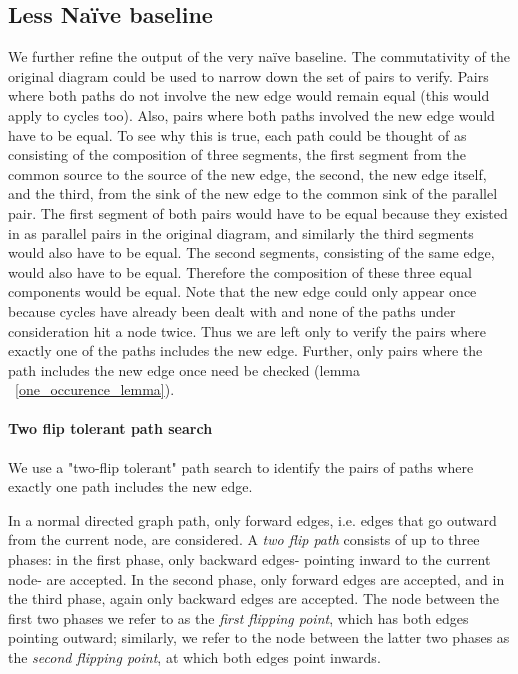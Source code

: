 \documentclass[sigplan,review,anonymous]{acmart}
\begin{document}
\subsection{Less Na\"{i}ve baseline}
We further refine the output of the very na\"{i}ve baseline.
The commutativity of the original diagram could be used to narrow down the set of pairs to verify.
Pairs where both paths do not involve the new edge would remain equal (this would apply to cycles too).
Also, pairs where both paths involved the new edge would have to be equal.
To see why this is true, each path could be thought of as consisting of the composition of three segments, the first segment from the common source to the source of the new edge, the second, the new edge itself, and the third, from the sink of the new edge to the common sink of the parallel pair.
The first segment of both pairs would have to be equal because they existed in as parallel pairs in the original diagram, and similarly the third segments would also have to be equal.
The second segments, consisting of the same edge, would also have to be equal. Therefore the composition of these three equal components would be equal. Note that the new edge could only appear once because cycles have already been dealt with and none of the paths under consideration hit a node twice.
Thus we are left only to verify the pairs where exactly one of the paths includes the new edge.
Further, only pairs where the path includes the new edge once need be checked (lemma ~\ref{one_occurence_lemma}).

\paragraph{Two flip tolerant path search}
We use a "two-flip tolerant" path search to identify the pairs of paths where exactly one path includes the new edge. 

In a normal directed graph path, only forward edges, i.e. edges that go outward from the current node, are considered. 
A \textit{two flip path} consists of up to three phases: in the first phase, only backward edges- pointing inward to the current node- are accepted. In the second phase, only forward edges are accepted, and in the third phase, again only backward edges are accepted. The node between the first two phases we refer to as the \textit{first flipping point}, which has both edges pointing outward; similarly, we refer to the node between the latter two phases as the \textit{second flipping point}, at which both edges point inwards.
\end{document}
